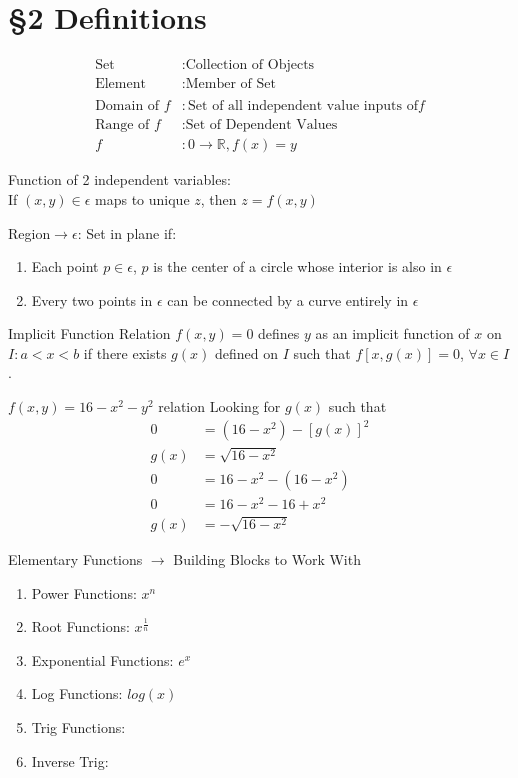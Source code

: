 \section{\S 2 Definitions}
\begin{align*}
    \text{Set} & : \text{Collection of Objects}\\
    \text{Element} & : \text{Member of Set}\\\\
    \text{Domain of }f & : \text{Set of all independent value inputs of} f\\
    \text{Range of }f & : \text{Set of Dependent Values}\\
    f & : 0 \rightarrow \mathbb{R}, f(x)=y
\end{align*}
\begin{remark} Function of 2 independent variables:\\
If $(x,y)\in \epsilon$ maps to unique $z$, then $z=f(x,y)$ 
\end{remark}
\begin{remark} Region$\rightarrow \epsilon$: Set in plane if:\\
\begin{enumerate}
  \item Each point $p \in \epsilon$, $p$ is the center of a circle whose interior is also in $\epsilon$
  \item Every two points in $\epsilon$ can be connected by a curve entirely in $\epsilon$
\end{enumerate}
\end{remark}
\begin{imp:defn}{Implicit Function}{} Relation $f(x,y)=0$ defines $y$ as an implicit function of $x$ on $I:a<x<b$ if there exists $g(x)$ defined on $I$ such that $f[x,g(x)]=0$, $\forall x \in I$.
\end{imp:defn}
\begin{remark} $f(x,y)=16-x^{2}-y^{2}$ relation
Looking for $g(x)$ such that
\begin{align*}
    0 & = (16-x^{2})-[g(x)]^{2}\\
    g(x) & = \sqrt{16-x^{2}}\\
    0 & = 16-x^{2}-(16-x^{2})\\
    0 & = 16-x^2-16+x^{2}\\
    g(x) & = -\sqrt{16-x^{2}}
\end{align*}
\end{remark}
\begin{remark}Elementary Functions $\rightarrow$ Building Blocks to Work With
\begin{enumerate}
    \item Power Functions: $x^{n}$
    \item Root Functions: $x^{\frac{1}{n}}$
    \item Exponential Functions: $e^{x}$
    \item Log Functions: $log(x)$
    \item Trig Functions:
    \item Inverse Trig:
\end{enumerate}
\end{remark}
